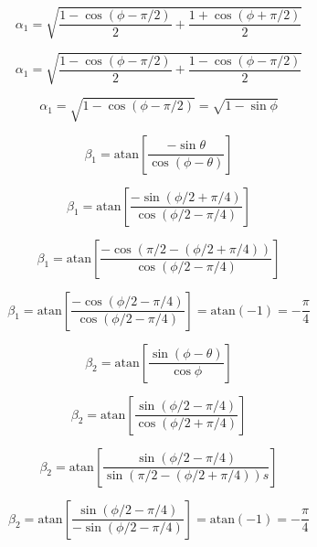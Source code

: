 \documentclass{article}
\begin{document}
\begin{equation}
	\alpha_1 = \sqrt{\frac{1-\cos(\phi-\pi/2)}{2}+\frac{1+\cos(\phi+\pi/2)}{2}}
\end{equation}

\begin{equation}
	\alpha_1 = \sqrt{\frac{1-\cos(\phi-\pi/2)}{2}+\frac{1-\cos(\phi-\pi/2)}{2}}
\end{equation}

\begin{equation}
	\alpha_1 = \sqrt{1-\cos(\phi-\pi/2)} = \sqrt{1-\sin\phi}
\end{equation}

\begin{equation}
	\beta_1 = \text{atan}\left[\frac{-\sin\theta}{\cos(\phi-\theta)}\right]
\end{equation}

\begin{equation}
	\beta_1 = \text{atan}\left[\frac{-\sin(\phi/2+\pi/4)}{\cos(\phi/2-\pi/4)}\right]
\end{equation}

\begin{equation}
	\beta_1 = \text{atan}\left[\frac{-\cos(\pi/2-(\phi/2+\pi/4))}{\cos(\phi/2-\pi/4)}\right]
\end{equation}

\begin{equation}
	\beta_1 = \text{atan}\left[\frac{-\cos(\phi/2-\pi/4)}{\cos(\phi/2-\pi/4)}\right] = \text{atan}(-1) = -\frac{\pi}{4}
\end{equation}

\begin{equation}
	\beta_2 = \text{atan}\left[\frac{\sin(\phi-\theta)}{\cos\phi}\right]
\end{equation}

\begin{equation}
	\beta_2 = \text{atan}\left[\frac{\sin(\phi/2-\pi/4)}{\cos(\phi/2+\pi/4)}\right]
\end{equation}

\begin{equation}
	\beta_2 = \text{atan}\left[\frac{\sin(\phi/2-\pi/4)}{\sin(\pi/2-(\phi/2+\pi/4))s}\right]
\end{equation}

\begin{equation}
	\beta_2 = \text{atan}\left[\frac{\sin(\phi/2-\pi/4)}{-\sin(\phi/2-\pi/4)}\right] = \text{atan}(-1) = -\frac{\pi}{4}
\end{equation}\\
\end{document}
